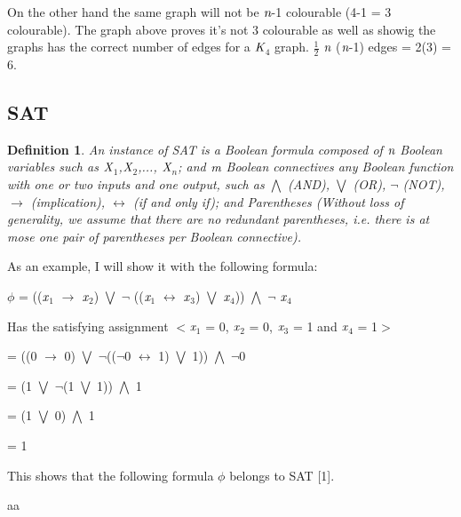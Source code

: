 \documentclass[a4paper]{report}
\newtheorem{mydef}{Definition}
\begin{document}
\vspace{3mm}
On the other hand the same graph will not be $\emph{n}$-1 colourable (4-1 = 3 colourable). The graph above proves it's not 3 colourable as well as showig the graphs has the correct number of edges for a $\emph{K}$$_{4}$ graph. $\frac{1}{2}$ $\emph{n}$ ($\emph{n}$-1) edges = 2(3) = 6.

\vspace{3mm}

\subsection{SAT}

\begin{mydef}
An instance of SAT is a Boolean formula composed of $\emph{n}$ Boolean variables such as $\emph{X}$$_{1}$,$\emph{X}$$_{2}$,..., $\emph{X}$$_{n}$; and $\emph{m}$ Boolean connectives any Boolean function with one or two inputs and one output, such as $\bigwedge$ (AND), $\bigvee$ (OR), $\neg$ (NOT), $\rightarrow$ (implication), $\leftrightarrow$ (if and only if); and Parentheses (Without loss of generality, we assume that there are no redundant parentheses, i.e. there is at mose one pair of parentheses per Boolean connective).
\end{mydef}

As an example, I will show it with the following formula:

$\phi$ = (($\emph{x}$$_{1}$ $\rightarrow$ $\emph{x}$$_{2}$) $\bigvee$ $\neg$ (($\emph{x}$$_{1}$ $\leftrightarrow$ $\emph{x}$$_{3}$) $\bigvee$ $\emph{x}$$_{4}$)) $\bigwedge$ $\neg$ $\emph{x}$$_{4}$


Has the satisfying assignment $<$$\emph{x}$$_{1}$ = 0, $\emph{x}$$_{2}$ = 0, $\emph{x}$$_{3}$ = 1 and $\emph{x}$$_{4}$ = 1$>$

= ((0 $\rightarrow$ 0) $\bigvee$ $\neg$(($\neg$0 $\leftrightarrow$ 1) $\bigvee$ 1)) $\bigwedge$ $\neg$0

= (1 $\bigvee$ $\neg$(1 $\bigvee$ 1)) $\bigwedge$ 1

= (1 $\bigvee$ 0) $\bigwedge$ 1

= 1


This shows that the following formula $\phi$ belongs to SAT [1].


aa
\end{document}
